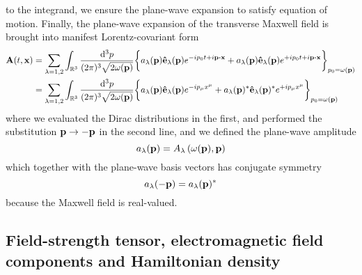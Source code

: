 to the integrand, we ensure the plane-wave expansion to satisfy equation of motion.
Finally, the plane-wave expansion of the transverse Maxwell field is brought into manifest Lorentz-covariant form
\begin{equation}
	\begin{split}
		\vb{A}(t,\vb{x})
		&=
		\sum_{\lambda=1,2}
		\int_{\mathbb{R}^3}\frac{\dd[3]{p}}{(2\pi)^3\sqrt{2\omega(\vb{p})}}
		\biggl\{
			a_\lambda(\vb{p})
			\vu{e}_\lambda(\vb{p})
			e^{-ip_0t+i\vb{p}\vdot\vb{x}}
			+
			a_\lambda(\vb{p})
			\vu{e}_\lambda(\vb{p})
			e^{+ip_0t+i\vb{p}\vdot\vb{x}}
		\biggr\}_{p_0=\omega(\vb{p})}
		\\
		&=
		\sum_{\lambda=1,2}
		\int_{\mathbb{R}^3}\frac{\dd[3]{p}}{(2\pi)^3\sqrt{2\omega(\vb{p})}}
		\biggl\{
			a_\lambda(\vb{p})
			\vu{e}_\lambda(\vb{p})
			e^{-ip_\mu x^\mu}
			+
			a_\lambda(\vb{p})^*
			\vu{e}_\lambda(\vb{p})^*
			e^{+ip_\mu x^\mu}
		\biggr\}_{p_0=\omega(\vb{p})}
	\end{split}
\end{equation}
where we evaluated the Dirac distributions in the first, and performed the substitution $\vb{p}\to-\vb{p}$ in the second line, and we defined the plane-wave amplitude
\begin{equation}
	a_\lambda(\vb{p})
	=
	A_\lambda\left(\omega(\vb{p}),\vb{p}\right)
\end{equation}
which together with the plane-wave basis vectors has conjugate symmetry
\begin{equation}
	a_\lambda(-\vb{p})
	=
	a_\lambda(\vb{p})^*	
\end{equation}
because the Maxwell field is real-valued.

\subsection{Field-strength tensor, electromagnetic field components and Hamiltonian density}

